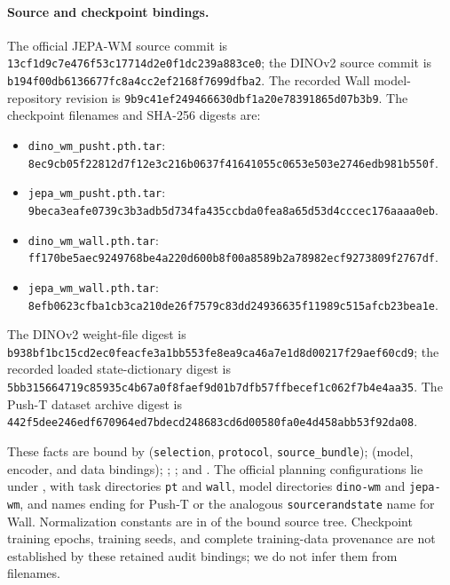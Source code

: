 \documentclass{article}
\begin{document}
\paragraph{Source and checkpoint bindings.}
The official JEPA-WM source commit is
\nolinkurl{13cf1d9c7e476f53c17714d2e0f1dc239a883ce0};
the DINOv2 source commit is
\nolinkurl{b194f00db6136677fc8a4cc2ef2168f7699dfba2}.
The recorded Wall model-repository revision is
\nolinkurl{9b9c41ef249466630dbf1a20e78391865d07b3b9}.
The checkpoint filenames and SHA-256 digests are:
\begin{itemize}
\item \texttt{dino\_wm\_pusht.pth.tar}:\\
\texttt{8ec9cb05f22812d7f12e3c216b0637f4}\allowbreak\texttt{1641055c0653e503e2746edb981b550f}.
\item \texttt{jepa\_wm\_pusht.pth.tar}:\\
\texttt{9beca3eafe0739c3b3adb5d734fa435c}\allowbreak\texttt{cbda0fea8a65d53d4cccec176aaaa0eb}.
\item \texttt{dino\_wm\_wall.pth.tar}:\\
\texttt{ff170be5aec9249768be4a220d600b8f}\allowbreak\texttt{00a8589b2a78982ecf9273809f2767df}.
\item \texttt{jepa\_wm\_wall.pth.tar}:\\
\texttt{8efb0623cfba1cb3ca210de26f7579c8}\allowbreak\texttt{3dd24936635f11989c515afcb23bea1e}.
\end{itemize}
The DINOv2 weight-file digest is
\texttt{b938bf1bc15cd2ec0feacfe3a1bb553f}\allowbreak\texttt{e8ea9ca46a7e1d8d00217f29aef60cd9};
the recorded loaded state-dictionary digest is
\texttt{5bb315664719c85935c4b67a0f8faef9}\allowbreak\texttt{d01b7dfb57ffbecef1c062f7b4e4aa35}.
The Push-T dataset archive digest is
\texttt{442f5dee246edf670964ed7bdecd2486}\allowbreak\texttt{83cd6d00580fa0e4d458abb53f92da08}.

These facts are bound by
(\texttt{selection}, \texttt{protocol}, \texttt{source\_bundle});
(model, encoder, and data bindings);
;
; and
.
The official planning configurations lie under
, with task directories \texttt{pt}
and \texttt{wall}, model directories \texttt{dino-wm} and \texttt{jepa-wm},
and names ending
for Push-T or the analogous \texttt{sourcerandstate} name for Wall.
Normalization constants are in
 of the bound source tree.
Checkpoint training epochs, training seeds, and complete training-data
provenance are not established by these retained audit bindings; we do not
infer them from filenames.
\end{document}
